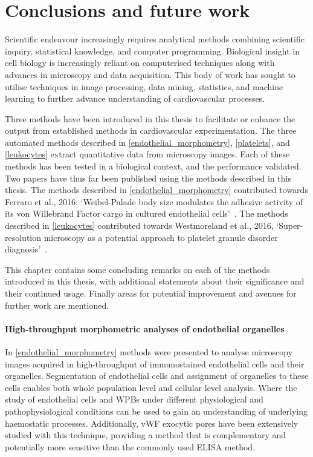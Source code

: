 \chapter{Conclusions and future work}
\label{conclusions_and_future}
\ifpdf
    \graphicspath{{chapter_5/figs/}}
\fi

Scientific endeavour increasingly requires analytical methods combining scientific inquiry, statistical knowledge, and computer programming. Biological insight in cell biology is increasingly reliant on computerised techniques along with advances in microscopy and data acquisition. This body of work has sought to utilise techniques in image processing, data mining, statistics, and machine learning to further advance understanding of cardiovascular processes.

Three methods have been introduced in this thesis to facilitate or enhance the output from established methods in cardiovascular experimentation. The three automated methods described in \autoref{endothelial_morphometry}, \autoref{platelets}, and \autoref{leukocytes} extract quantitative data from microscopy images. Each of these methods has been tested in a biological context, and the performance validated. Two papers have thus far been published using the methods described in this thesis. The methods described in \autoref{endothelial_morphometry} contributed towards Ferraro et al., 2016: `Weibel-Palade body size modulates the adhesive activity of its von Willebrand Factor cargo in cultured endothelial cells'~\cite{Ferraro2016}. The methods described in \autoref{leukocytes} contributed towards Westmoreland et al., 2016, `Super-resolution microscopy as a potential approach to platelet granule disorder diagnosis'~\cite{Westmoreland2016}. 

This chapter contains some concluding remarks on each of the methods introduced in this thesis, with additional statements about their significance and their continued usage. Finally areas for potential improvement and avenues for further work are mentioned.

\subsubsection{High-throughput morphometric analyses of endothelial organelles}
In \autoref{endothelial_morphometry} methods were presented to analyse microscopy images acquired in high-throughput of immunostained endothelial cells and their organelles. Segmentation of endothelial cells and assignment of organelles to these cells enables both whole population level and cellular level analysis. Where the study of endothelial cells and WPBs under different physiological and pathophysiological conditions can be used to gain an understanding of underlying haemostatic processes. Additionally, vWF exocytic pores have been extensively studied with this technique, providing a method that is complementary and potentially more sensitive than the commonly used ELISA method.

